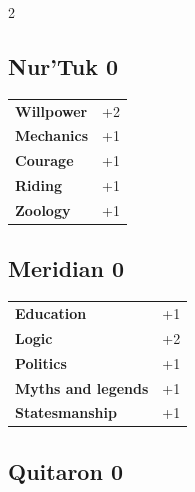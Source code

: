 \begin{multicols}{2}
\begin{tcolorbox}
\end{tcolorbox}

\begin{tcolorbox}
    \subsection*{Nur'Tuk \hfill \small{0 }}
    \tcblower




\begin{tabular}{@{}ll@{}}
    \textbf{Willpower} & +2\\
    \textbf{Mechanics} & +1\\
    \textbf{Courage} & +1\\
    \textbf{Riding} & +1\\
    \textbf{Zoology} & +1\\
\end{tabular}


\end{tcolorbox}

\begin{tcolorbox}
    \subsection*{Meridian \hfill \small{0 }}
    \tcblower




\begin{tabular}{@{}ll@{}}
    \textbf{Education} & +1\\
    \textbf{Logic} & +2\\
    \textbf{Politics} & +1\\
    \textbf{Myths and legends} & +1\\
    \textbf{Statesmanship} & +1\\
\end{tabular}


\end{tcolorbox}

\begin{tcolorbox}
    \subsection*{Quitaron \hfill \small{0 }}
    \tcblower





\end{tcolorbox}
\end{multicols}
